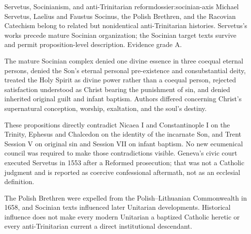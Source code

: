 \begin{heresydossier}{Servetus, Socinianism, and anti-Trinitarian reform}{dossier:socinian-axis}
\objectfield Michael Servetus, Laelius and Faustus Socinus, the Polish Brethren, and the Racovian Catechism belong to related but nonidentical anti-Trinitarian histories. Servetus's works precede mature Socinian organization; the Socinian target texts survive and permit proposition-level description. Evidence grade A.

\propositionfield The mature Socinian complex denied one divine essence in three coequal eternal persons, denied the Son's eternal personal pre-existence and consubstantial deity, treated the Holy Spirit as divine power rather than a coequal person, rejected satisfaction understood as Christ bearing the punishment of sin, and denied inherited original guilt and infant baptism. Authors differed concerning Christ's supernatural conception, worship, exaltation, and the soul's destiny.

\responsefield These propositions directly contradict Nicaea I and Constantinople I on the Trinity, Ephesus and Chalcedon on the identity of the incarnate Son, and Trent Session V on original sin and Session VII on infant baptism. No new ecumenical council was required to make those contradictions visible. Geneva's civic court executed Servetus in 1553 after a Reformed prosecution; that was not a Catholic judgment and is reported as coercive confessional aftermath, not as an ecclesial definition.

\aftermathfield The Polish Brethren were expelled from the Polish--Lithuanian Commonwealth in 1658, and Socinian texts influenced later Unitarian developments. Historical influence does not make every modern Unitarian a baptized Catholic heretic or every anti-Trinitarian current a direct institutional descendant.
\end{heresydossier}

